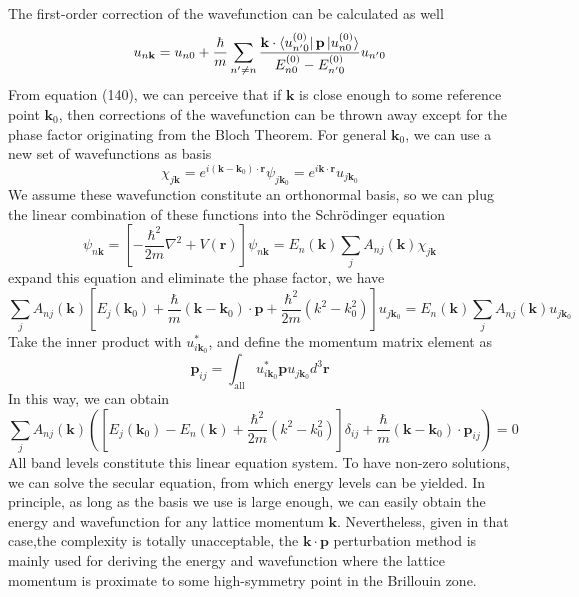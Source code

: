 \documentclass{article}
\begin{document}
\begin{equation}
\end{equation}The first-order correction of the wavefunction can be calculated as well\begin{equation}
    u_{n\mathbf{k}}=u_{n0}+\frac{\hbar}{m}\sum_{n'\neq{n}}\frac{\mathbf{k}\cdot\bra{u_{n'0}^{(0)}}\mathbf{p}\ket{u_{n0}^{(0)}}}{E_{n0}^{(0)}-E_{n'0}^{(0)}}u_{n'0}
\end{equation}From equation (140), we can perceive that if $\mathbf{k}$ is close enough to some reference point $\mathbf{k}_0$, then corrections of the wavefunction can be thrown away except for the phase factor originating from the Bloch Theorem. For general $\mathbf{k}_0$, we can use a new set of wavefunctions as basis\begin{equation}
    \chi_{j\mathbf{k}}=e^{i(\mathbf{k}-\mathbf{k}_0)\cdot\mathbf{r}}\psi_{j\mathbf{k}_0}=e^{i\mathbf{k}\cdot\mathbf{r}}u_{j\mathbf{k}_0}
\end{equation}We assume these wavefunction constitute an orthonormal basis, so we can plug the linear combination of these functions into the Schr\"odinger equation\begin{equation}
    [\frac{p^2}{2m}+V(\mathbf{r})]\psi_{n\mathbf{k}}=[-\frac{\hbar^2}{2m}\nabla^2+V(\mathbf{r})]\psi_{n\mathbf{k}}=E_n(\mathbf{k})\sum_jA_{nj}(\mathbf{k})\chi_{j\mathbf{k}}
\end{equation}expand this equation and eliminate the phase factor, we have\begin{equation}
    \sum_jA_{nj}(\mathbf{k})[E_j(\mathbf{k}_0)+\frac{\hbar}{m}(\mathbf{k}-\mathbf{k}_0)\cdot\mathbf{p}+\frac{\hbar^2}{2m}(k^2-k_0^2)]u_{j\mathbf{k}_0}=E_n(\mathbf{k})\sum_jA_{nj}(\mathbf{k})u_{j\mathbf{k}_0}
\end{equation}Take the inner product with $u^*_{i\mathbf{k}_0}$, and define the momentum matrix element as\begin{equation}
    \mathbf{p}_{ij}=\int_\mathrm{all}u^*_{i\mathbf{k}_0}\mathbf{p}u_{j\mathbf{k}_0}d^3\mathbf{r}
\end{equation}In this way, we can obtain\begin{equation}
    \sum_jA_{nj}(\mathbf{k})([E_j(\mathbf{k}_0)-E_n(\mathbf{k})+\frac{\hbar^2}{2m}(k^2-k_0^2)]\delta_{ij}+\frac{\hbar}{m}(\mathbf{k}-\mathbf{k}_0)\cdot\mathbf{p}_{ij})=0
\end{equation}All band levels constitute this linear equation system. To have non-zero solutions, we can solve the secular equation, from which energy levels can be yielded. In principle, as long as the basis we use is large enough, we can easily obtain the energy and wavefunction for any lattice momentum $\mathbf{k}$. Nevertheless, given in that case,the complexity is totally unacceptable, the $\mathbf{k}\cdot\mathbf{p}$ perturbation method is mainly used for deriving the energy and wavefunction where the lattice momentum is proximate to some high-symmetry point in the Brillouin zone.\\
\end{document}

